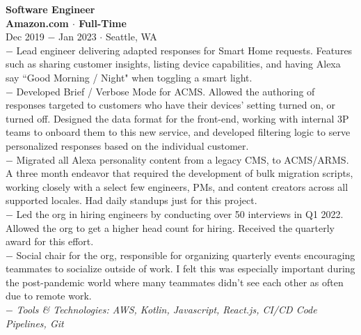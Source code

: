 \documentclass{resume}
\begin{document}
\begin{flushleft}
\normalsize{\bf Software Engineer}\\
\footnotesize{\bf Amazon.com $\cdot$ Full-Time}\\
\footnotesize{Dec 2019 $-$ Jan 2023 $\cdot$ Seattle, WA}\\[1mm]
{\scriptsize
	$-$ Lead engineer delivering adapted responses for Smart Home requests. Features such as sharing customer insights, listing device capabilities, and having Alexa say ``Good Morning / Night" when toggling a smart light. \\
	$-$ Developed Brief / Verbose Mode for ACMS. Allowed the authoring of responses targeted to customers who have their devices' setting turned on, or turned off. Designed the data format for the front-end, working with internal 3P teams to onboard them to this new service, and developed filtering logic to serve personalized responses based on the individual customer. \\
	$-$ Migrated all Alexa personality content from a legacy CMS, to ACMS/ARMS. A three month endeavor that required the development of bulk migration scripts, working closely with a select few engineers, PMs, and content creators across all supported locales. Had daily standups just for this project. \\
	$-$ Led the org in hiring engineers by conducting over 50 interviews in Q1 2022. Allowed the org to get a higher head count for hiring. Received the quarterly award for this effort. \\
	$-$ Social chair for the org, responsible for organizing quarterly events encouraging teammates to socialize outside of work. I felt this was especially important during the post-pandemic world where many teammates didn't see each other as often due to remote work. \\
	$-$ \textit{Tools \& Technologies: AWS, Kotlin, Javascript, React.js, CI/CD Code Pipelines, Git}
}\\[3mm]



\end{flushleft}
\end{document}
